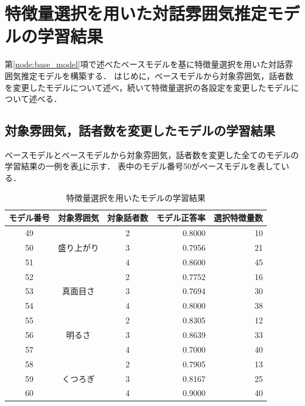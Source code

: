 \section{特徴量選択を用いた対話雰囲気推定モデルの学習結果\label{node:learning_result_with_ga}}

第\ref{node:base_model}項で述べたベースモデルを基に特徴量選択を用いた対話雰囲気推定モデルを構築する．
はじめに，ベースモデルから対象雰囲気，話者数を変更したモデルについて述べ，続いて特徴量選択の各設定を変更したモデルについて述べる．

\subsection{対象雰囲気，話者数を変更したモデルの学習結果\label{item:learning_result_with_ga_change_targets}}

ベースモデルとベースモデルから対象雰囲気，話者数を変更した全てのモデルの学習結果の一例を表\ref{tab:learn_result_with_ga}に示す．
表中のモデル番号50がベースモデルを表している．

\begin{table}[t]
    \caption{特徴量選択を用いたモデルの学習結果}
    \centering
    \begin{tabular}{|c|c|c|r|r|}
        \hline
        モデル番号 & 対象雰囲気 & 対象話者数 & モデル正答率 & 選択特徴量数 \\
        \hline\hline
        49 & \multirow{3}{*}{盛り上がり} & 2 & 0.8000 & 10 \\ \cline{1-1}\cline{3-5}
        50 & & 3 & 0.7956 & 21 \\ \cline{1-1}\cline{3-5}
        51 & & 4 & 0.8600 & 45 \\ \hline
        52 & \multirow{3}{*}{真面目さ} & 2 & 0.7752 & 16 \\ \cline{1-1}\cline{3-5}
        53 & & 3 & 0.7694 & 30 \\ \cline{1-1}\cline{3-5}
        54 & & 4 & 0.8000 & 38 \\ \hline
        55 & \multirow{3}{*}{明るさ} & 2 & 0.8305 & 12 \\ \cline{1-1}\cline{3-5}
        56 & & 3 & 0.8639 & 33 \\ \cline{1-1}\cline{3-5}
        57 & & 4 & 0.7000 & 40 \\ \hline
        58 & \multirow{3}{*}{くつろぎ} & 2 & 0.7905 & 13 \\ \cline{1-1}\cline{3-5}
        59 & & 3 & 0.8167 & 25 \\ \cline{1-1}\cline{3-5}
        60 & & 4 & 0.9000 & 40 \\ \hline
    \end{tabular}
    \label{tab:learn_result_with_ga}
\end{table}


